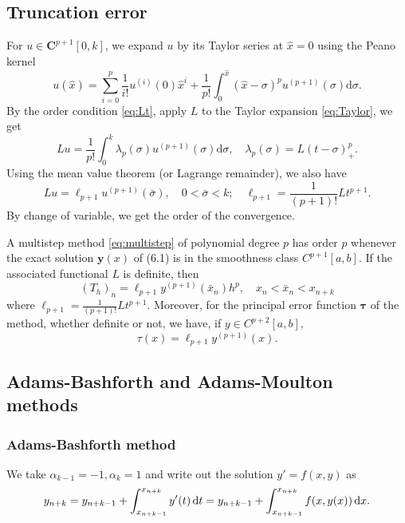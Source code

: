 \documentclass[10pt]{amsart}
\begin{document}
\subsection{Truncation error}
For ${u} \in \boldsymbol{C}^{p+1}[0, k]$, we expand $u$ by its Taylor series at $\hat x = 0$ using the Peano kernel
\begin{equation}\label{eq:Taylor}
u(\hat x) = \sum_{i=0}^p \frac{1}{i!}u^{(i)}(0) \hat x^i + \frac{1}{p!} \int_0^{\hat x} (\hat x- \sigma)^p {u}^{(p+1)}(\sigma) \mathrm{d} \sigma.
\end{equation}
By the order condition \eqref{eq:Lt}, apply $L$ to the Taylor expansion \eqref{eq:Taylor}, we get
$$
L {u}=\frac{1}{p!} \int_0^k \lambda_p(\sigma) {u}^{(p+1)}(\sigma) \mathrm{d} \sigma, \quad \lambda_p(\sigma)=L(t-\sigma)_{+}^p.
$$
Using the mean value theorem (or Lagrange remainder), we also have
$$
L {u}=\ell_{p+1} {u}^{(p+1)}(\bar{\sigma}), \quad 0<\bar{\sigma}<k ; \quad \ell_{p+1}= \frac{1}{(p+1)!} L t^{p+1}.
$$
By change of variable, we get the order of the convergence.

\begin{theorem}
A multistep method \eqref{eq:multistep} of polynomial degree $p$ has order $p$ whenever the exact solution $\boldsymbol{y}(x)$ of (6.1) is in the smoothness class $C^{p+1}[a, b]$. If the associated functional $L$ is definite, then
$$
\left({T}_h\right)_n=\ell_{p+1} {y}^{(p+1)}\left(\bar{x}_n\right) h^p, \quad x_n<\bar{x}_n<x_{n+k}
$$
where $\ell_{p+1} = \frac{1}{(p+1)!} L t^{p+1}$. Moreover, for the principal error function $\boldsymbol{\tau}$ of the method, whether definite or not, we have, if ${y} \in C^{p+2}[a, b]$,
$$
{\tau}(x)=\ell_{p+1} {y}^{(p+1)}(x).
$$
\end{theorem}

\subsection{Adams-Bashforth and Adams-Moulton methods}

\subsubsection{Adams-Bashforth method}
We take $\alpha_{k-1} = -1, \alpha_{k} = 1$ and write out the  solution $y' = f(x, y)$ as
\begin{equation}
y_{n+k} = y_{n+k-1} + \int_{x_{n+k-1}}^{x_{n+k}} y'(t)\,{\rm d} t = y_{n+k-1} + \int_{x_{n+k-1}}^{x_{n+k}} f(x, y(x))\,{\rm d}x.
\end{equation}
\end{document}
